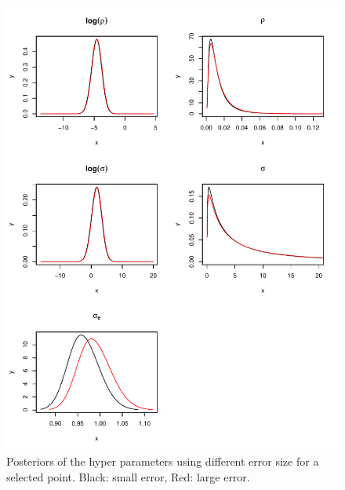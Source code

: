 \documentclass[a4paper,12pt]{article}
\begin{document}
 \begin{figure}[htbp]
 \begin{center}
 \includegraphics[scale=0.8]{fig/PointErr_hyperpar.pdf}
 \end{center}
 \caption[Posteriors of hyper parameters]{Posteriors of the hyper parameters using different error size for a selected point. Black: small error, Red: large error.}
 \label{fig:5}
 \end{figure}
 
\end{document}
